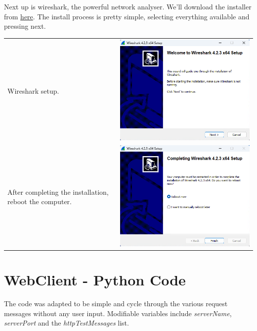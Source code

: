 \documentclass[11pt,a4paper]{report}
\begin{document}
        Next up is wireshark, the powerful network analyser.
        We'll download the installer from \href{https://www.wireshark.org/download.html}{here}.
        The install process is pretty simple, selecting everything available and pressing next.
        \begin{tabular}{ l r }
Wireshark setup. & \includegraphics[scale=0.3]{install_wireshark02} \\
After completing the installation, reboot the computer. & \includegraphics[scale=0.3]{install_wireshark21} \\
        \end{tabular}

    \section{WebClient - Python Code}
        \lstset{style=pythoncode}
        
        The code was adapted to be simple and cycle through the various request messages without any user input.
        Modifiable variables include \textit{serverName}, \textit{serverPort} and the \textit{httpTestMessages} list.
\end{document}
